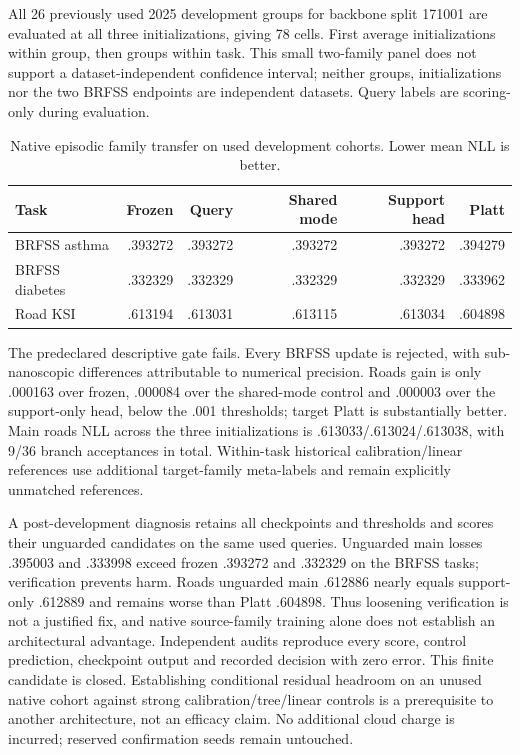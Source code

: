 \documentclass[10pt]{article}
\begin{document}
All 26 previously used 2025 development groups for backbone split 171001 are evaluated at all three initializations, giving 78 cells. First average initializations within group, then groups within task. This small two-family panel does not support a dataset-independent confidence interval; neither groups, initializations nor the two BRFSS endpoints are independent datasets. Query labels are scoring-only during evaluation.
\begin{table}[t]
\centering\small
\caption{Native episodic family transfer on used development cohorts. Lower mean NLL is better.}
\begin{tabular}{lrrrrr}
\toprule
Task & Frozen & Query & Shared mode & Support head & Platt\\
\midrule
BRFSS asthma & .393272 & .393272 & .393272 & .393272 & .394279\\
BRFSS diabetes & .332329 & .332329 & .332329 & .332329 & .333962\\
Road KSI & .613194 & .613031 & .613115 & .613034 & .604898\\
\bottomrule
\end{tabular}
\end{table}
The predeclared descriptive gate fails. Every BRFSS update is rejected, with sub-nanoscopic differences attributable to numerical precision. Roads gain is only .000163 over frozen, .000084 over the shared-mode control and .000003 over the support-only head, below the .001 thresholds; target Platt is substantially better. Main roads NLL across the three initializations is .613033/.613024/.613038, with 9/36 branch acceptances in total. Within-task historical calibration/linear references use additional target-family meta-labels and remain explicitly unmatched references.

A post-development diagnosis retains all checkpoints and thresholds and scores their unguarded candidates on the same used queries. Unguarded main losses .395003 and .333998 exceed frozen .393272 and .332329 on the BRFSS tasks; verification prevents harm. Roads unguarded main .612886 nearly equals support-only .612889 and remains worse than Platt .604898. Thus loosening verification is not a justified fix, and native source-family training alone does not establish an architectural advantage. Independent audits reproduce every score, control prediction, checkpoint output and recorded decision with zero error. This finite candidate is closed. Establishing conditional residual headroom on an unused native cohort against strong calibration/tree/linear controls is a prerequisite to another architecture, not an efficacy claim. No additional cloud charge is incurred; reserved confirmation seeds remain untouched.
\end{document}
